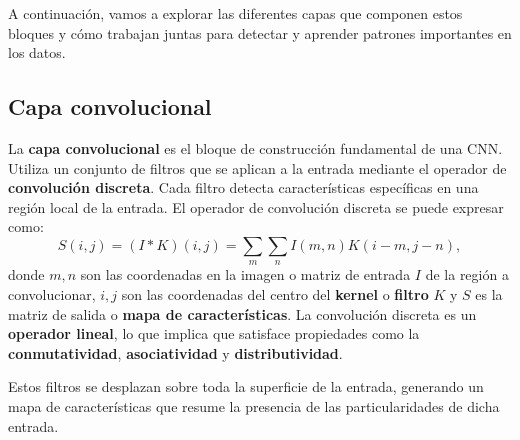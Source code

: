 A continuación, vamos a explorar las diferentes capas que componen estos bloques
y cómo trabajan juntas para detectar y aprender patrones importantes en los datos.

\subsection{Capa convolucional}

La \textbf{capa convolucional} es el bloque de construcción fundamental de una CNN.
Utiliza un conjunto de filtros que se aplican a la entrada mediante el operador
de \textbf{convolución discreta}. Cada filtro detecta características
específicas en una región local de la entrada. El operador de convolución discreta
se puede expresar como:
\begin{equation}
	S(i, j) = (I \ast K)(i, j) = \sum_{m} \sum_{n} I(m, n) K(i-m, j-n),
\end{equation}
donde $m,n$ son las coordenadas en la imagen o matriz de entrada $I$ de la
región a convolucionar, $i,j$ son las coordenadas del centro del \textbf{kernel}
o \textbf{filtro} $K$ y $S$ es la matriz de salida o \textbf{mapa de
	características}. La convolución discreta es un \textbf{operador lineal}, lo que
implica que satisface propiedades como la \textbf{conmutatividad}, \textbf{asociatividad}
y \textbf{distributividad}.

Estos filtros se desplazan sobre toda la superficie de la entrada, generando un
mapa de características que resume la presencia de las particularidades de dicha
entrada.

